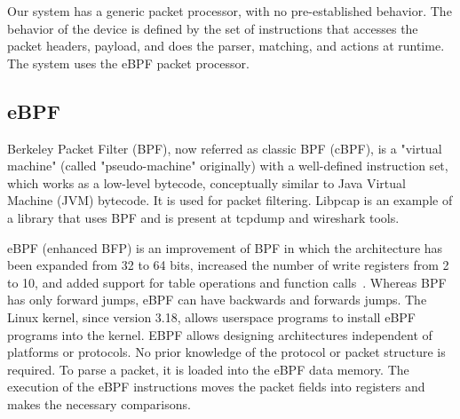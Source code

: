 Our system has a generic packet processor, with no pre-established behavior.
The behavior of the device is defined by the set of instructions that accesses the packet headers, payload, and does the parser, matching, and actions at runtime.
The system uses the eBPF packet processor.

\subsection{eBPF}

Berkeley Packet Filter (BPF)\cite{McCanne:1993:BPF:1267303.1267305}, now referred as classic BPF (cBPF), is a "virtual machine" (called "pseudo-machine" originally) with a well-defined instruction set, which works as a low-level bytecode, conceptually similar to Java Virtual Machine (JVM) bytecode. It is used for packet filtering. Libpcap is an example of a library that uses BPF and is present at tcpdump and wireshark tools.



eBPF (enhanced BFP) is an improvement of BPF in which the architecture has been expanded from 32 to 64 bits, increased the number of write registers from 2 to 10, and added support for table operations and function calls~\cite{eBPF}.
Whereas BPF has only forward jumps, eBPF can have backwards and forwards jumps.
The Linux kernel, since version 3.18, allows userspace programs to install eBPF programs into the kernel. 
EBPF allows designing architectures independent of platforms or protocols.
No prior knowledge of the protocol or packet structure is required. 
To parse a packet, it is loaded into the eBPF data memory. The execution of the eBPF instructions moves the packet fields into registers and makes the necessary comparisons.


